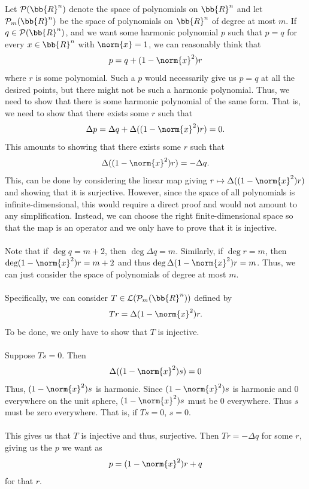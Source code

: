 \documentclass[12pt,letterpaper]{hmcpset}
\begin{document}
\begin{solution}
	Let $\mathcal{P}(\bb{R}^n)$ denote the space of polynomials on $\bb{R}^n$ and let $\mathcal{P}_m(\bb{R}^n)$ be the space of polynomials on $\bb{R}^n$ of degree at most $m$.
	If $q \in \mathcal{P}(\bb{R}^n)$, and we want some harmonic polynomial $p$ such that \( p = q \) for every \( x \in \bb{R}^n \) with \( \norm{x} = 1 \), we can reasonably think that
	\[
		p = q + (1 - \norm{x}^2)r
	\]
	where $r$ is some polynomial. Such a $p$ would necessarily give us \( p = q \) at all the desired points, but there might not be such a harmonic polynomial. Thus, we need to show that there is some harmonic polynomial of the same form. That is, we need to show that there exists some $r$ such that
	\[
		\Delta p = \Delta q + \Delta ((1 - \norm{x}^2)r) = 0.
	\]
	This amounts to showing that there exists some $r$ such that
	\[
		\Delta ((1 - \norm{x}^2)r) = -\Delta q.
	\]
	This, can be done by considering the linear map giving \( r \mapsto \Delta ((1 - \norm{x}^2)r) \) and showing that it is surjective. However, since the space of all polynomials is infinite-dimensional, this would require a direct proof and would not amount to any simplification. Instead, we can choose the right finite-dimensional space so that the map is an operator and we only have to prove that it is injective.\\\\
	Note that if \( \operatorname{deg} q  = m + 2 \), then \( \operatorname{deg} \Delta q = m \). Similarly, if \( \operatorname{deg} r = m \), then \( \deg (1 - \norm{x}^2) r  = m + 2 \) and thus \( \deg \Delta (1 - \norm{x}^2) r  = m \). Thus, we can just consider the space of polynomials of degree at most $m$.\\\\
	Specifically, we can consider \( T \in \mathcal{L}(\mathcal{P}_m(\bb{R}^n))\) defined by
	\[
		Tr = \Delta (1 - \norm{x}^2) r.
	\]
	To be done, we only have to show that $T$ is injective.\\\\
	Suppose \( Ts = 0 \). Then
	\[
		\Delta ((1 - \norm{x}^2) s) = 0
	\]
	Thus, \( (1 - \norm{x}^2) s \) is harmonic. Since $(1 - \norm{x}^2) s$ is harmonic and $0$ everywhere on the unit sphere, $(1 - \norm{x}^2)s$ must be $0$ everywhere. Thus $s$ must be zero everywhere. That is, if $Ts = 0$, $s = 0$.\\\\
	This gives us that $T$ is injective and thus, surjective. Then $Tr = - \Delta q$ for some $r$, giving us the $p$ we want as
	\[
		p = (1 - \norm{x}^2)r + q
	\]
	for that $r$.
\end{solution}
\end{document}
